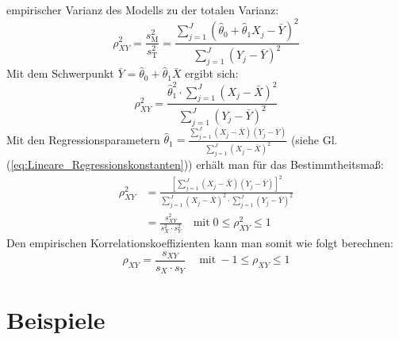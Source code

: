 empirischer Varianz des Modells zu der totalen Varianz:
\[
\rho_{XY}^2 = \frac{s_{\mathrm{M}}^2}{s_{\mathrm{T}}^2} = \frac{\sum\limits_{j = 1}^J {(\hat{\theta}_0 + \hat{\theta}_1 X_j - \bar {Y})^2} }{\sum\limits_{j = 1}^J {(Y_j - \bar{Y})^2} }
\]
Mit dem Schwerpunkt $\bar {Y} = \hat{\theta}_0 + \hat{\theta}_1 \bar {X}$ ergibt sich:
\[
\rho_{XY}^2 = \frac{\hat{\theta}_1^2 \cdot \sum\limits_{j = 1}^J 
	{(X_j - \bar X)^2} }{\sum\limits_{j = 1}^J {(Y_j - \bar {Y})^2} }
\]
Mit den Regressionsparametern $\hat{\theta}_1 = \frac{\sum\limits_{j =
		1}^J {(X_j - \bar {X})(Y_j - \bar {Y})} }{\sum\limits_{j = 1}^J {(X_j
		- \bar {X})^2} }$ (siehe Gl.(\ref{eq:Lineare_Regressionskonstanten})) erhält man für das 
Bestimmtheitsmaß:
\begin{align}
\rho_{XY}^2 &= \frac{\left[ {\sum\limits_{j = 1}^J {(X_j - \bar {X})(Y_j - \bar{Y})} } \right]^2}{\sum\limits_{j = 1}^J {(X_j - \bar {X})^2}
	\cdot
	\sum\limits_{j = 1}^J {(Y_j - \bar {Y})^2} } \nonumber \\[2ex]
&= \frac{s_{XY} ^2}{s_X ^2 \cdot s_Y ^2} \quad \textrm{mit}\; 
0 \le \rho_{XY}^2 \le 1 
\end{align} 
Den empirischen Korrelationskoeffizienten kann man somit wie folgt
berechnen:
\begin{equation}
\rho_{XY} = \frac{ s_{XY} }{ s_X \cdot s_Y } \quad \mathrm{~mit~}  - 1 \le \rho_{XY} \le 1
\end{equation}
\newpage
\section{Beispiele}
\label{Vorl2Regressionsaufg2}
